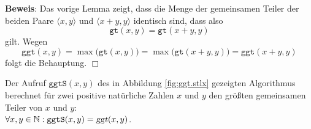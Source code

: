 \noindent
\textbf{Beweis}: Das vorige Lemma zeigt, dass die Menge der gemeinsamen Teiler
der beiden Paare $\langle x, y \rangle$ und $\langle x + y, y \rangle$ identisch sind,
dass also 
\[ \texttt{gt}(x,y) = \texttt{gt}(x + y, y) \]
gilt.  Wegen
\[ \texttt{ggt}(x,y) = \max\bigl(\texttt{gt}(x,y)\bigr) = \max\bigl(\texttt{gt}(x+y,y)\bigr)
   = \texttt{ggt}(x+y,y)
\]
folgt die Behauptung. \hspace*{\fill} $\Box$


\begin{Satz} \label{satz:euklid_korrekt}
Der Aufruf $\texttt{ggtS}(x, y)$ des in Abbildung \ref{fig:ggt.stlx} gezeigten Algorithmus berechnet 
für zwei positive natürliche Zahlen $x$ und $y$ den größten gemeinsamen Teiler von $x$ und $y$:
\\[0.2cm]
\hspace*{1.3cm}
$\forall x, y \in \mathbb{N}: \mathtt{ggtS}(x, y) = \textsl{ggt}(x,y)$.
\end{Satz}

